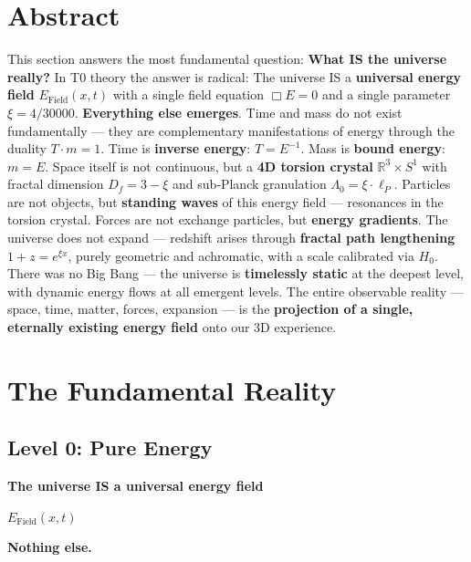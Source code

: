 \section*{Abstract}
		This section answers the most fundamental question: \textbf{What IS the universe really?} In T0 theory the answer is radical: The universe IS a \textbf{universal energy field} $E_{\text{Field}}(x,t)$ with a single field equation $\Box E = 0$ and a single parameter $\xi = 4/30000$. \textbf{Everything else emerges}. Time and mass do not exist fundamentally — they are complementary manifestations of energy through the duality $T \cdot m = 1$. Time is \textbf{inverse energy}: $T = E^{-1}$. Mass is \textbf{bound energy}: $m = E$. Space itself is not continuous, but a \textbf{4D torsion crystal} $\mathbb{R}^3 \times S^1$ with fractal dimension $D_f = 3-\xi$ and sub‑Planck granulation $\Lambda_0 = \xi \cdot \ell_P$. Particles are not objects, but \textbf{standing waves} of this energy field — resonances in the torsion crystal. Forces are not exchange particles, but \textbf{energy gradients}. The universe does not expand — redshift arises through \textbf{fractal path lengthening} $1+z = e^{\xi x}$, purely geometric and achromatic, with a scale calibrated via $H_0$. There was no Big Bang — the universe is \textbf{timelessly static} at the deepest level, with dynamic energy flows at all emergent levels. The entire observable reality — space, time, matter, forces, expansion — is the \textbf{projection of a single, eternally existing energy field} onto our 3D experience.


	\section{The Fundamental Reality}

	\subsection{Level 0: Pure Energy}

	\begin{revolutionary}[What the Universe IS]

		\begin{center}
			\textbf{The universe IS a universal energy field}

			\vspace{0.3cm}

			$E_{\text{Field}}(x,t)$

			\vspace{0.3cm}

			\textbf{Nothing else.}
		\end{center}
		\normalsize
	\end{revolutionary}

